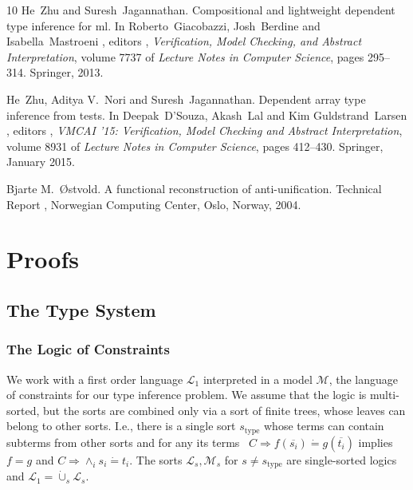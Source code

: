 \documentclass{article}
\newcommand{\tmop}[1]{\ensuremath{\operatorname{#1}}}
\newcommand{\tmtextit}[1]{{\itshape{#1}}}
\begin{document}
\begin{thebibliography}{10}
  He~Zhu  and  Suresh~Jagannathan.{\newblock}
  Compositional and lightweight dependent type inference for ml.{\newblock} In
  Roberto~Giacobazzi, Josh~Berdine  and  Isabella~Mastroeni , editors ,
  \tmtextit{Verification, Model Checking, and Abstract Interpretation}, 
  volume  7737  of \tmtextit{Lecture Notes in Computer Science},  pages 
  295--314. Springer, 2013.{\newblock}
  
  He~Zhu, Aditya V.~Nori  and 
  Suresh~Jagannathan.{\newblock} Dependent array type inference from
  tests.{\newblock} In  Deepak~D'Souza, Akash~Lal  and  Kim Guldstrand~Larsen
  , editors , \tmtextit{VMCAI '15: Verification, Model Checking and Abstract
  Interpretation},  volume  8931  of \tmtextit{Lecture Notes in Computer
  Science},  pages  412--430. Springer, January 2015.{\newblock}
  
  Bjarte M.~{\O}stvold.{\newblock} A functional
  reconstruction of anti-unification.{\newblock} Technical Report , Norwegian
  Computing Center, Oslo, Norway, 2004.{\newblock}
\end{thebibliography}

\appendix\chapter{Proofs}\label{ChapProofs}

\section{The Type System}

\subsection{The Logic of Constraints}

We work with a first order language $\mathcal{L}_1$ interpreted in a model
$\mathcal{M}$, the language of constraints for our type inference problem. We
assume that the logic is multi-sorted, but the sorts are combined only via a
sort of finite trees, whose leaves can belong to other sorts. I.e., there is a
single sort $s_{\tmop{type}}$ whose terms can contain subterms from other
sorts and for any its terms \ $C \Rightarrow f (\overline{s_i}) \dot{=} g
(\overline{t_i})$ implies $f = g$ and $C \Rightarrow \wedge_i s_i \dot{=}
t_i$. The sorts $\mathcal{L}_s, \mathcal{M}_s$ for $s \neq s_{\tmop{type}}$
are single-sorted logics and $\mathcal{L}_1 = \dot{\cup}_s \mathcal{L}_s$.
\end{document}
